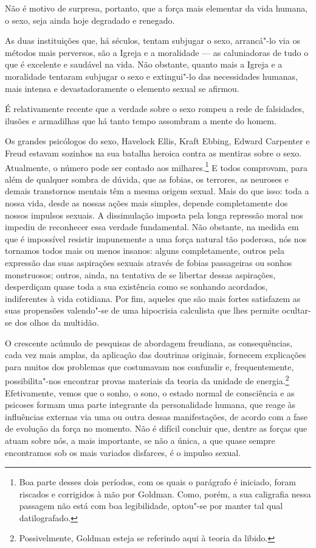 Não é motivo de surpresa, portanto, que a força mais elementar da vida
humana, o sexo, seja ainda hoje degradado e renegado.

As duas instituições que, há séculos, tentam subjugar o sexo, arrancá"-lo
via os métodos mais perversos, são a Igreja e a moralidade --- as
caluniadoras de tudo o que é excelente e saudável na vida. Não obstante,
quanto mais a Igreja e a moralidade tentaram subjugar o sexo e extingui"-lo
das necessidades humanas, mais intensa e devastadoramente o elemento
sexual se afirmou.

É relativamente recente que a verdade sobre o sexo rompeu a rede de
falsidades, ilusões e armadilhas que há tanto tempo assombram a mente do
homem.

Os grandes psicólogos do sexo, Havelock Ellis, Kraft Ebbing, Edward
Carpenter e Freud estavam sozinhos na sua batalha heroica contra as
mentiras sobre o sexo. Atualmente, o número pode ser contado aos
milhares.\footnote{Boa parte desses dois períodos, com os quais o
  parágrafo é iniciado, foram riscados e corrigidos à mão por Goldman.
  Como, porém, a sua caligrafia nessa passagem não está com boa
  legibilidade, optou"-se por manter tal qual datilografado.} E todos
comprovam, para além de qualquer sombra de dúvida, que as fobias, os
terrores, as neuroses e demais transtornos mentais têm a mesma origem
sexual. Mais do que isso: toda a nossa vida, desde as nossas ações mais
simples, depende completamente dos nossos impulsos sexuais. A
dissimulação imposta pela longa repressão moral nos impediu de
reconhecer essa verdade fundamental. Não obstante, na medida em que é
impossível resistir impunemente a uma força natural tão poderosa, nós
nos tornamos todos mais ou menos insanos: alguns completamente, outros
pela expressão das suas aspirações sexuais através de fobias passageiras ou
sonhos monstruosos; outros, ainda, na tentativa de se libertar dessas
aspirações, desperdiçam quase toda a sua existência como se sonhando
acordados, indiferentes à vida cotidiana. Por fim, aqueles que são mais
fortes satisfazem as suas propensões valendo"-se de uma hipocrisia
calculista que lhes permite ocultar-se dos olhos da multidão.

O crescente acúmulo de pesquisas de abordagem freudiana, as
consequências, cada vez mais amplas, da aplicação das doutrinas originais,
fornecem explicações para muitos dos problemas que costumavam nos
confundir e, frequentemente, possibilita"-nos encontrar provas materiais
da teoria da unidade de energia.\footnote{Possivelmente, Goldman esteja
  se referindo aqui à teoria da libido.} Efetivamente, vemos que o
sonho, o sono, o estado normal de consciência e as psicoses formam uma
parte integrante da personalidade humana, que reage às influências
externas via uma ou outra dessas manifestações, de acordo com a fase de
evolução da força no momento. Não é difícil concluir que, dentre as forças que
atuam sobre nós, a mais importante, se não a única, a que quase sempre
encontramos sob os mais variados disfarces, é o impulso sexual.

